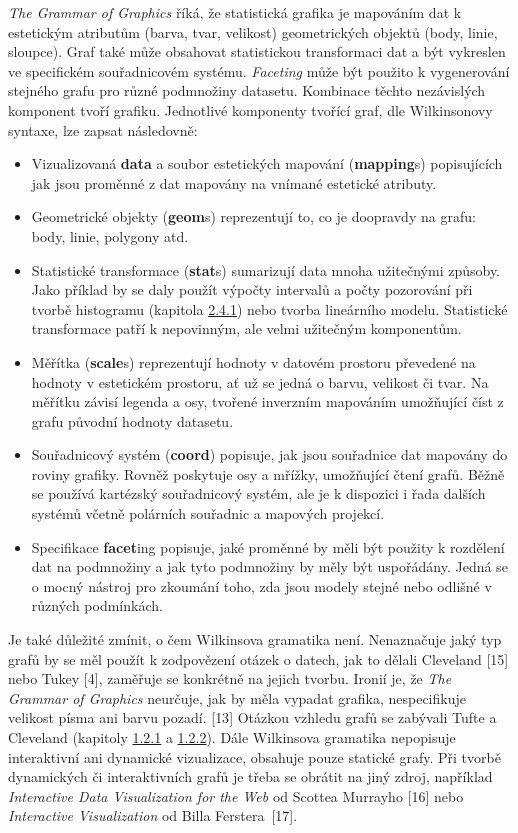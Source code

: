 \documentclass[12pt,]{article}
\providecommand{\tightlist}{%
  \setlength{\itemsep}{0pt}\setlength{\parskip}{0pt}}
\begin{document}
\qquad \textit{The Grammar of Graphics} říká, že statistická grafika je
mapováním dat k estetickým atributům (barva, tvar, velikost)
geometrických objektů (body, linie, sloupce). Graf také může obsahovat
statistickou transformaci dat a být vykreslen ve specifickém
souřadnicovém systému. \emph{Faceting} může být použito k vygenerování
stejného grafu pro různé podmnožiny datasetu. Kombinace těchto
nezávislých komponent tvoří grafiku. Jednotlivé komponenty tvořící graf,
dle Wilkinsonovy syntaxe, lze zapsat následovně:

\begin{itemize}
\tightlist
\item
  Vizualizovaná \textbf{data} a soubor estetických mapování
  (\textbf{mapping}s) popisujících jak jsou proměnné z dat mapovány na
  vnímané estetické atributy.
\item
  Geometrické objekty (\textbf{geom}s) reprezentují to, co je doopravdy
  na grafu: body, linie, polygony atd.
\item
  Statistické transformace (\textbf{stat}s) sumarizují data mnoha
  užitečnými způsoby. Jako příklad by se daly použít výpočty intervalů a
  počty pozorování při tvorbě histogramu (kapitola
  \protect\hyperlink{hist}{2.4.1}) nebo tvorba lineárního modelu.
  Statistické transformace patří k nepovinným, ale velmi užitečným
  komponentům.
\item
  Měřítka (\textbf{scale}s) reprezentují hodnoty v datovém prostoru
  převedené na hodnoty v estetickém prostoru, ať už se jedná o barvu,
  velikost či tvar. Na měřítku závisí legenda a osy, tvořené inverzním
  mapováním umožňující číst z grafu původní hodnoty datasetu.
\item
  Souřadnicový systém (\textbf{coord}) popisuje, jak jsou souřadnice dat
  mapovány do roviny grafiky. Rovněž poskytuje osy a mřížky, umožňující
  čtení grafů. Běžně se používá kartézský souřadnicový systém, ale je k
  dispozici i řada dalších systémů včetně polárních souřadnic a mapových
  projekcí.
\item
  Specifikace \textbf{facet}ing popisuje, jaké proměnné by měli být
  použity k rozdělení dat na podmnožiny a jak tyto podmnožiny by měly
  být uspořádány. Jedná se o mocný nástroj pro zkoumání toho, zda jsou
  modely stejné nebo odlišné v různých podmínkách.
\end{itemize}

\qquad Je také důležité zmínit, o čem Wilkinsova gramatika není.
Nenaznačuje jaký typ grafů by se měl použít k zodpovězení otázek o
datech, jak to dělali Cleveland {[}15{]} nebo Tukey {[}4{]}, zaměřuje se
konkrétně na jejich tvorbu. Ironií je, že
\textit{The Grammar of Graphics} neurčuje, jak by měla vypadat grafika,
nespecifikuje velikost písma ani barvu pozadí. {[}13{]} Otázkou vzhledu
grafů se zabývali Tufte a Cleveland (kapitoly
\protect\hyperlink{tufte}{1.2.1} a
\protect\hyperlink{cleveland}{1.2.2}). Dále Wilkinsova gramatika
nepopisuje interaktivní ani dynamické vizualizace, obsahuje pouze
statické grafy. Při tvorbě dynamických či interaktivních grafů je třeba
se obrátit na jiný zdroj, například \emph{Interactive Data Visualization
for the Web} od Scottea Murrayho {[}16{]} nebo \emph{Interactive
Visualization} od Billa Ferstera~{[}17{]}. \newpage
\end{document}
